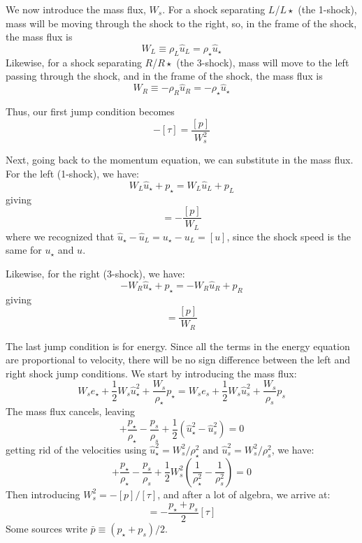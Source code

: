We now introduce the mass flux, $W_s$.  For a shock separating
$L$/$L\star$ (the 1-shock), mass will be moving through the shock to the
right, so, in the frame of the shock, the mass flux is
\begin{equation}
W_L \equiv \rho_L \hat{u}_L = \rho_\star \hat{u}_\star
\end{equation}
Likewise, for a shock separating $R$/$R\star$ (the 3-shock), mass will
move to the left passing through the shock, and in the frame of the
shock, the mass flux is
\begin{equation}
W_R \equiv -\rho_R \hat{u}_R = -\rho_\star \hat{u}_\star
\end{equation}

Thus, our first jump condition becomes
\begin{equation}
-[\tau] = \frac{[p]}{W_s^2}
\end{equation}

Next, going back to the momentum equation, we can substitute in the
mass flux.  For the left (1-shock), we have:
\begin{equation}
W_L \hat{u}_\star + p_\star = W_L \hat{u}_L + p_L
\end{equation}
giving
\begin{equation}
[u] = -\frac{[p]}{W_L}
\end{equation}
where we recognized that $\hat{u}_\star - \hat{u}_L = u_\star - u_L =
[u]$, since the shock speed is the same for $u_\star$ and $u$.

Likewise, for the right (3-shock), we have:
\begin{equation}
-W_R \hat{u}_\star + p_\star = -W_R \hat{u}_R + p_R
\end{equation}
giving
\begin{equation}
[u] = \frac{[p]}{W_R}
\end{equation}

The last jump condition is for energy.  Since all the terms in the 
energy equation are proportional to velocity, there will be no sign
difference between the left and right shock jump conditions.  
We start by introducing the mass flux:
\begin{equation}
W_s e_\star + \frac{1}{2} W_s \hat{u}_\star^2 + \frac{W_s}{\rho_\star} p_\star =
  W_s e_s + \frac{1}{2} W_s \hat{u}_s^2 + \frac{W_s}{\rho_s} p_s
\end{equation}
The mass flux cancels, leaving
\begin{equation}
[e] + \frac{p_\star}{\rho_\star} - \frac{p_s}{\rho_s} + \frac{1}{2} \left ( \hat{u}_\star^2 - \hat{u}_s^2 \right ) = 0
\end{equation}
getting rid of the velocities using $\hat{u}_\star^2 = W_s^2/\rho_\star^2$ and 
$\hat{u}_s^2 = W_s^2/\rho_s^2$, we have:
\begin{equation}
[e] + \frac{p_\star}{\rho_\star} - \frac{p_s}{\rho_s} + \frac{1}{2} W_s^2 \left ( \frac{1}{\rho_\star^2} - \frac{1}{\rho_s^2} \right ) = 0
\end{equation}
Then introducing $W_s^2 = -[p]/[\tau]$, and after a lot of algebra, we arrive at:
\begin{equation}
[e] = -\frac{p_\star + p_s}{2} [\tau]
\end{equation}
Some sources write $\bar{p} \equiv (p_\star + p_s)/2$.

